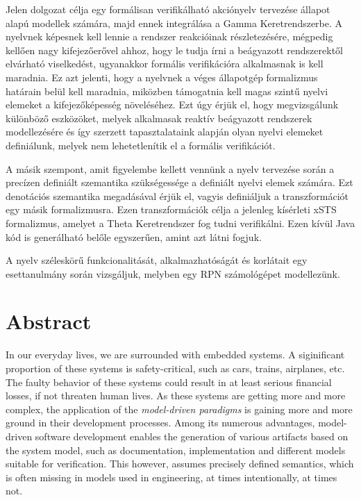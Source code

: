 Jelen dolgozat célja egy formálisan verifikálható akciónyelv tervezése állapot alapú modellek számára, majd ennek integrálása a Gamma Keretrendszerbe. A nyelvnek képesnek kell lennie a rendszer reakcióinak részletezésére, mégpedig kellően nagy kifejezőerővel ahhoz, hogy le tudja írni a beágyazott rendszerektől elvárható viselkedést, ugyanakkor formális verifikációra alkalmasnak is kell maradnia. Ez azt jelenti, hogy a nyelvnek a véges állapotgép formalizmus határain belül kell maradnia, miközben támogatnia kell magas szintű nyelvi elemeket a kifejezőképesség növeléséhez. Ezt úgy érjük el, hogy megvizsgálunk különböző eszközöket, melyek alkalmasak reaktív beágyazott rendszerek modellezésére és így szerzett tapasztalataink alapján olyan nyelvi elemeket definiálunk, melyek nem lehetetlenítik el a formális verifikációt.

A másik szempont, amit figyelembe kellett vennünk a nyelv tervezése során a precízen definiált szemantika szükségessége a definiált nyelvi elemek számára. Ezt denotációs szemantika megadásával érjük el, vagyis definiáljuk a transzformációt egy másik formalizmusra. Ezen transzformációk célja a jelenleg kísérleti xSTS formalizmus, amelyet a Theta Keretrendszer fog tudni verifikálni. Ezen kívül Java kód is generálható belőle egyszerűen, amint azt látni fogjuk.  

A nyelv széleskörű funkcionalitását, alkalmazhatóságát és korlátait egy esettanulmány során vizsgáljuk, melyben egy RPN számológépet modellezünk.

\vfill
\selectenglish


\chapter*{Abstract}

In our everyday lives, we are surrounded with embedded systems. A siginificant proportion of these systems is safety-critical, such as cars, trains, airplanes, etc. The faulty behavior of these systems could result in at least serious financial losses, if not threaten human lives. As these systems are getting more and more complex, the application of the \textit{model-driven paradigms} is gaining more and more ground in their development processes. Among its numerous advantages, model-driven software development enables the generation of various artifacts based on the system model, such as documentation, implementation and different models suitable for verification. This however, assumes precisely defined semantics, which is often missing in models used in engineering, at times intentionally, at times not.


